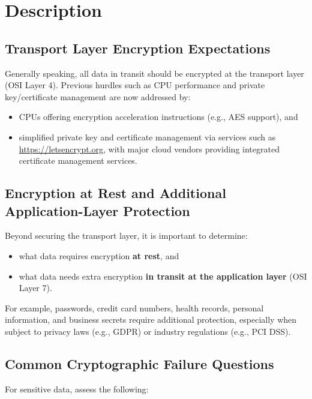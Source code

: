 \documentclass[11pt]{article}
\begin{document}
\section{Description}

\subsection{Transport Layer Encryption Expectations}
Generally speaking, all data in transit should be encrypted at the transport layer (OSI Layer 4). Previous hurdles such as CPU performance and private key/certificate management are now addressed by:
\begin{itemize}
  \item CPUs offering encryption acceleration instructions (e.g., AES support), and
  \item simplified private key and certificate management via services such as \url{https://letsencrypt.org}, with major cloud vendors providing integrated certificate management services.
\end{itemize}

\subsection{Encryption at Rest and Additional Application-Layer Protection}
Beyond securing the transport layer, it is important to determine:
\begin{itemize}
  \item what data requires encryption \textbf{at rest}, and
  \item what data needs extra encryption \textbf{in transit at the application layer} (OSI Layer 7).
\end{itemize}

For example, passwords, credit card numbers, health records, personal information, and business secrets require additional protection, especially when subject to privacy laws (e.g., GDPR) or industry regulations (e.g., PCI DSS).

\subsection{Common Cryptographic Failure Questions}
For sensitive data, assess the following:
\end{document}
